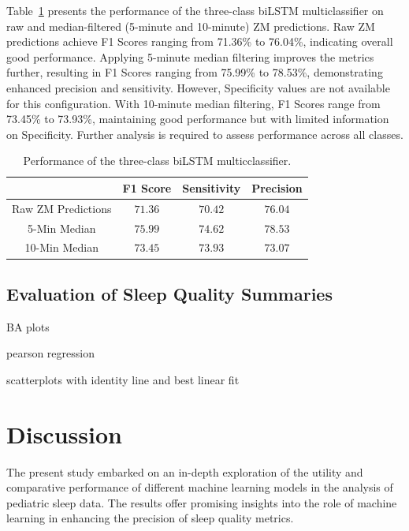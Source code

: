\documentclass[
  super,
  preprint,
  3p]{elsarticle}
\begin{document}
Table~\ref{tbl-biLSTM_performance} presents the performance of the
three-class biLSTM multiclassifier on raw and median-filtered (5-minute
and 10-minute) ZM predictions. Raw ZM predictions achieve F1 Scores
ranging from 71.36\% to 76.04\%, indicating overall good performance.
Applying 5-minute median filtering improves the metrics further,
resulting in F1 Scores ranging from 75.99\% to 78.53\%, demonstrating
enhanced precision and sensitivity. However, Specificity values are not
available for this configuration. With 10-minute median filtering, F1
Scores range from 73.45\% to 73.93\%, maintaining good performance but
with limited information on Specificity. Further analysis is required to
assess performance across all classes.

\hypertarget{tbl-biLSTM_performance}{}
\begin{longtable}{cccc}
\caption{\label{tbl-biLSTM_performance}Performance of the three-class biLSTM multicclassifier. }\tabularnewline

\toprule
 & F1 Score & Sensitivity & Precision \\ 
\midrule
Raw ZM Predictions & $71.36$ & $70.42$ & $76.04$ \\ 
5-Min Median & $75.99$ & $74.62$ & $78.53$ \\ 
10-Min Median & $73.45$ & $73.93$ & $73.07$ \\ 
\bottomrule
\end{longtable}

\hypertarget{evaluation-of-sleep-quality-summaries}{%
\subsection{Evaluation of Sleep Quality
Summaries}\label{evaluation-of-sleep-quality-summaries}}

BA plots

pearson regression

scatterplots with identity line and best linear fit

\hypertarget{discussion}{%
\section{Discussion}\label{discussion}}

The present study embarked on an in-depth exploration of the utility and
comparative performance of different machine learning models in the
analysis of pediatric sleep data. The results offer promising insights
into the role of machine learning in enhancing the precision of sleep
quality metrics.
\end{document}

